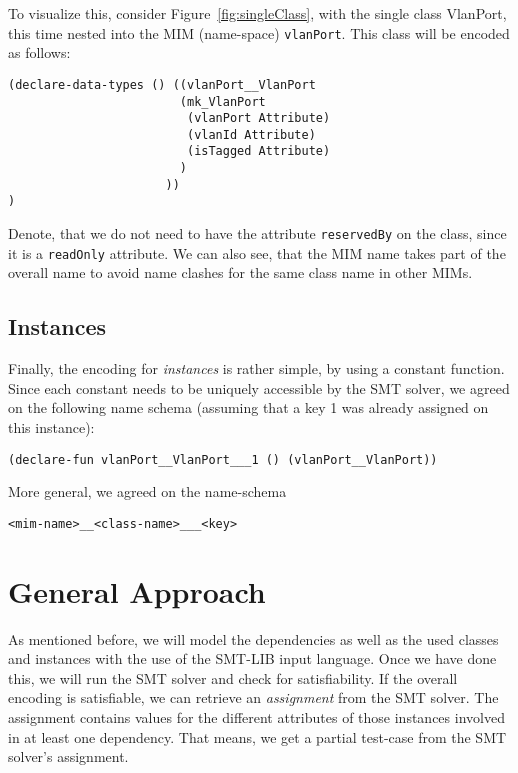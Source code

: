 To visualize this, consider Figure~\ref{fig:singleClass}, with the single class \textsf{VlanPort}, this time nested into the MIM (name-space) \verb|vlanPort|. This class will be encoded as follows:
\begin{verbatim}
(declare-data-types () ((vlanPort__VlanPort 
                        (mk_VlanPort 
                         (vlanPort Attribute)
                         (vlanId Attribute)
	                     (isTagged Attribute)
	                    )
	                  ))
)
\end{verbatim}
Denote, that we do not need to have the attribute \verb|reservedBy| on the class, since it is a \verb|readOnly| attribute. We can also see, that the MIM name takes part of the overall name to avoid name clashes for the same class name in other MIMs.\\

\subsection*{Instances}
Finally, the encoding for \emph{instances} is rather simple, by using a constant function. Since each constant needs to be uniquely accessible by the SMT solver, we agreed on the following name schema (assuming that a key 1 was already assigned on this instance):

\begin{verbatim}
(declare-fun vlanPort__VlanPort___1 () (vlanPort__VlanPort))
\end{verbatim}

More general, we agreed on the name-schema
\begin{verbatim}
<mim-name>__<class-name>___<key>
\end{verbatim}


\section{General Approach}

As mentioned before, we will model the dependencies as well as the used classes and instances with the use of the SMT-LIB input language. Once we have done this, we will run the SMT solver and check for satisfiability. If the overall encoding is satisfiable, we can retrieve an \emph{assignment} from the SMT solver. The assignment contains values for the different attributes of those instances involved in at least one dependency. That means, we get a partial test-case from the SMT solver's assignment. \\

